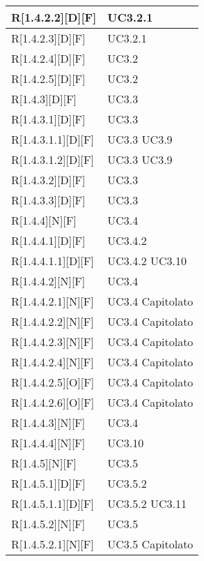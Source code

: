 \begin{longtable}{X | X}
\hline
R[1.4.2.2][D][F] & UC3.2.1 \\
\hline
R[1.4.2.3][D][F] & UC3.2.1 \\
\hline
R[1.4.2.4][D][F] & UC3.2 \\
\hline
R[1.4.2.5][D][F] & UC3.2 \\
\hline
R[1.4.3][D][F] & UC3.3 \\
\hline
R[1.4.3.1][D][F] & UC3.3 \\
\hline
R[1.4.3.1.1][D][F] & UC3.3 \newline UC3.9 \\
\hline
R[1.4.3.1.2][D][F] & UC3.3 \newline UC3.9 \\
\hline
R[1.4.3.2][D][F] & UC3.3 \\
\hline
R[1.4.3.3][D][F] & UC3.3 \\
\hline
R[1.4.4][N][F] & UC3.4 \\
\hline
R[1.4.4.1][D][F] & UC3.4.2 \\
\hline
R[1.4.4.1.1][D][F] & UC3.4.2 \newline UC3.10 \\
\hline
R[1.4.4.2][N][F] & UC3.4 \\
\hline
R[1.4.4.2.1][N][F] & UC3.4 \newline Capitolato \\
\hline
R[1.4.4.2.2][N][F] & UC3.4 \newline Capitolato \\
\hline
R[1.4.4.2.3][N][F] & UC3.4 \newline Capitolato \\
\hline
R[1.4.4.2.4][N][F] & UC3.4 \newline Capitolato \\
\hline
R[1.4.4.2.5][O][F] & UC3.4 \newline Capitolato \\
\hline
R[1.4.4.2.6][O][F] & UC3.4 \newline Capitolato \\
\hline
R[1.4.4.3][N][F] & UC3.4 \\
\hline
R[1.4.4.4][N][F] & UC3.10 \\
\hline
R[1.4.5][N][F] & UC3.5 \\
\hline
R[1.4.5.1][D][F] & UC3.5.2 \\
\hline
R[1.4.5.1.1][D][F] & UC3.5.2 \newline UC3.11 \\
\hline
R[1.4.5.2][N][F] & UC3.5 \\
\hline
R[1.4.5.2.1][N][F] & UC3.5 \newline Capitolato \\

\end{longtable}
